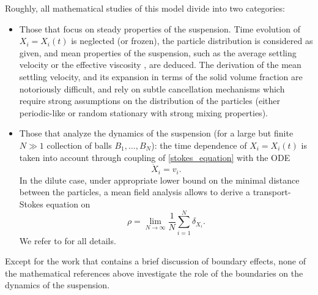 \documentclass[JEP,XML,SOM,Unicode,NoEqCountersInSection,published]{cedram}
\theoremstyle{plain}
\theoremstyle{definition}
\begin{document}
Roughly, all mathematical studies of this model divide into two categories:
\begin{itemize}
\item Those that focus on steady properties of the suspension. Time evolution of $X_i = X_i(t)$ is neglected (or frozen), the particle distribution is considered as given, and mean properties of the suspension, such as the average settling velocity \cite{HillairetHoefer23, Hasimoto59, Batchelor72Sedimentation, DuerinckxGloria22} or the effective viscosity \cite{HainesMazzucato12,NiethammerSchubert19, Gerard-Varet19, Gerard-VaretHillairet19, Gerard-VaretHoefer21, Gerard-VaretMecherbet20,DuerinckxGloria19}, are deduced. The derivation of the mean settling velocity, and its expansion in terms of the solid volume fraction are notoriously difficult, and rely on subtle cancellation mechanisms which require strong assumptions on the distribution of the particles (either periodic-like or random stationary with strong mixing properties).
\item Those that analyze the dynamics of the suspension (for a large but finite $N \gg 1$ collection of balls $B_1, \dots, B_N$): the time dependence of $X_i = X_i(t)$ is taken into account through coupling of \eqref{stokes_equation} with the ODE
\begin{equation}
\dot{X}_i = v_i.
\end{equation}
In the dilute case, under appropriate lower bound on the minimal distance between the particles, a mean field analysis allows to derive a transport-Stokes equation on
\[
\rho = \lim_{N\rightarrow \infty} \frac{1}{N} \sum_{i=1}^N \delta_{X_i}.
\]
We refer to \cite{Hofer18MeanField,Mecherbet19,Hofer&Schubert,HoferSchubert23} for all details.
\end{itemize}

Except for the work \cite{HillairetHoefer23} that contains a brief discussion of boundary effects, none of the mathematical references above investigate the role of the boundaries on the dynamics of the suspension.
\end{document}
